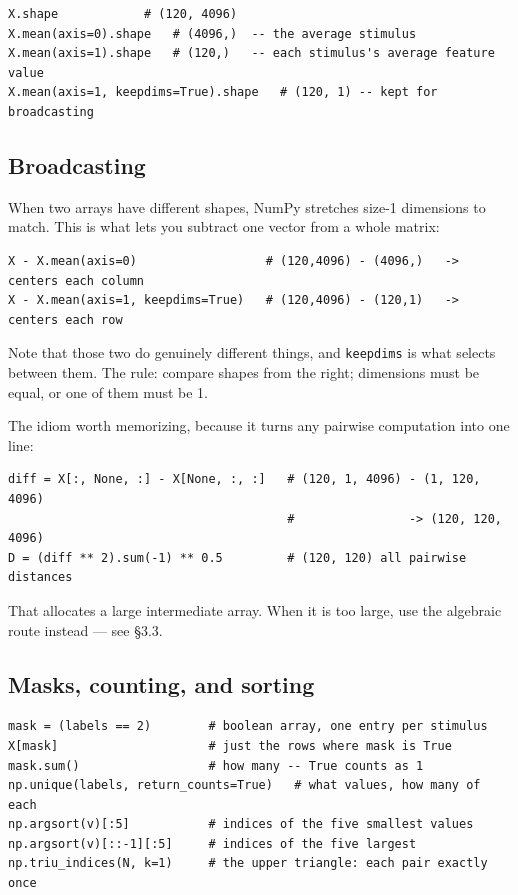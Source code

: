 \documentclass[11pt]{article}
\begin{document}
\begin{lstlisting}
X.shape            # (120, 4096)
X.mean(axis=0).shape   # (4096,)  -- the average stimulus
X.mean(axis=1).shape   # (120,)   -- each stimulus's average feature value
X.mean(axis=1, keepdims=True).shape   # (120, 1) -- kept for broadcasting
\end{lstlisting}

\subsection{Broadcasting}

When two arrays have different shapes, NumPy stretches size-1 dimensions to
match. This is what lets you subtract one vector from a whole matrix:

\begin{lstlisting}
X - X.mean(axis=0)                  # (120,4096) - (4096,)   -> centers each column
X - X.mean(axis=1, keepdims=True)   # (120,4096) - (120,1)   -> centers each row
\end{lstlisting}

Note that those two do genuinely different things, and \texttt{keepdims} is
what selects between them. The rule: compare shapes from the right; dimensions
must be equal, or one of them must be 1.

The idiom worth memorizing, because it turns any pairwise computation into one
line:

\begin{lstlisting}
diff = X[:, None, :] - X[None, :, :]   # (120, 1, 4096) - (1, 120, 4096)
                                       #                -> (120, 120, 4096)
D = (diff ** 2).sum(-1) ** 0.5         # (120, 120) all pairwise distances
\end{lstlisting}

That allocates a large intermediate array. When it is too large, use the
algebraic route instead --- see §3.3.

\subsection{Masks, counting, and sorting}

\begin{lstlisting}
mask = (labels == 2)        # boolean array, one entry per stimulus
X[mask]                     # just the rows where mask is True
mask.sum()                  # how many -- True counts as 1
np.unique(labels, return_counts=True)   # what values, how many of each
np.argsort(v)[:5]           # indices of the five smallest values
np.argsort(v)[::-1][:5]     # indices of the five largest
np.triu_indices(N, k=1)     # the upper triangle: each pair exactly once
\end{lstlisting}
\end{document}
